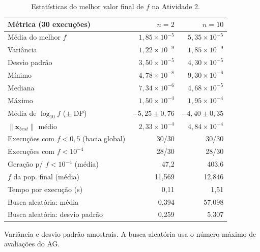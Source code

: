 \begin{table}[!t]
\centering
\footnotesize
\setlength{\tabcolsep}{4pt}
\caption{Estatísticas do melhor valor final de $f$ na Atividade 2.}
\label{tab:a2_stats}
\begin{tabular}{@{}lrr@{}}
\toprule
Métrica (30 execuções) & $n=2$ & $n=10$ \\
\midrule
Média do melhor $f$ & $1{,}85\times10^{-5}$ & $5{,}35\times10^{-5}$ \\
Variância & $1{,}22\times10^{-9}$ & $1{,}85\times10^{-9}$ \\
Desvio padrão & $3{,}50\times10^{-5}$ & $4{,}30\times10^{-5}$ \\
Mínimo & $4{,}78\times10^{-8}$ & $9{,}30\times10^{-6}$ \\
Mediana & $7{,}34\times10^{-6}$ & $4{,}68\times10^{-5}$ \\
Máximo & $1{,}50\times10^{-4}$ & $1{,}95\times10^{-4}$ \\
Média de $\log_{10} f$ ($\pm$ DP) & $-5{,}25 \pm 0{,}76$ & $-4{,}40 \pm 0{,}35$ \\
$\|\mathbf{x}_{best}\|$ médio & $2{,}33\times10^{-4}$ & $4{,}84\times10^{-4}$ \\
Execuções com $f<0{,}5$ (bacia global) & 30/30 & 30/30 \\
Execuções com $f<10^{-4}$ & 28/30 & 28/30 \\
Geração p/ $f<10^{-4}$ (média) & 47{,}2 & 403{,}6 \\
$\bar f$ da pop. final (média) & 11{,}569 & 12{,}846 \\
Tempo por execução (s) & 0{,}11 & 1{,}51 \\
\midrule
Busca aleatória: média & 0{,}394 & 57{,}098 \\
Busca aleatória: desvio padrão & 0{,}259 & 5{,}307 \\
\bottomrule
\end{tabular}
\par\smallskip\parbox{0.95\linewidth}{\scriptsize Variância e desvio padrão amostrais. A busca aleatória usa o número máximo de avaliações do AG.}
\end{table}
